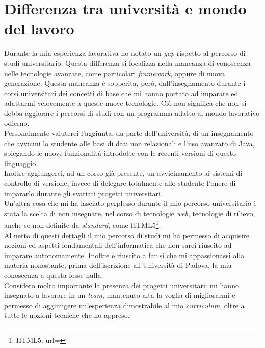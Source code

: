 \section{Differenza tra università e mondo del lavoro}
Durante la mia esperienza lavorativa ho notato un \textit{gap} rispetto al percorso di studi universitario. Questa differenza si focalizza nella mancanza di conoscenza nelle tecnologie avanzate, come particolari \textit{\gls{framework}}, oppure di nuova generazione. Questa mancanza è sopperita, però, dall'insegnamento durante i corsi universitari dei concetti di base che mi hanno portato ad imparare ed adattarmi velocemente a queste nuove tecnologie. Ciò non significa che non si debba aggiorare i percorsi di studi con un programma adatto al mondo lavorativo odierno.\\ Personalmente valuterei l'aggiunta, da parte dell'università, di un insegnamento che avvicini lo studente alle basi di dati non relazionali e l'uso avanzato di Java, spiegando le nuove funzionalità introdotte con le recenti versioni di questo linguaggio.\\
Inoltre aggiungerei, ad un corso già presente, un avvicinamento ai sistemi di controllo di versione, invece di delegare totalmente allo studente l'onere di impararlo durante gli svariati progetti universitari.\\
Un'altra cosa che mi ha lasciato perplesso durante il mio percorso universitario è stata la scelta di non insegnare, nel corso di tecnologie \textit{web}, tecnologie di rilievo, anche se non definite da \textit{standard}, come HTML5\footnote{HTML5: url= }.\\
Al netto di questi dettagli il mio percorso di studi mi ha permesso di acquisire nozioni ed aspetti fondamentali dell'informatica che non sarei riuscito ad imparare autonomamente. Inoltre è riuscito a far si che mi appassionassi alla materia nonostante, prima dell'iscrizione all'Università di Padova, la mia conoscenza a questa fosse nulla. \\Considero molto importante la presenza dei progetti universitari: mi hanno insegnato a lavorare in un \textit{team}, mantenuto alta la voglia di migliorarmi e permesso di aggiungere un'esperienza dimostrabile al mio \textit{curriculum}, oltre a tutte le nozioni tecniche che ho appreso.

